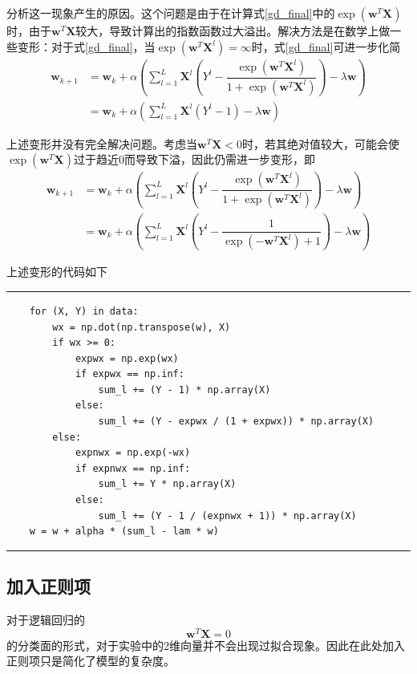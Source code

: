 分析这一现象产生的原因。这个问题是由于在计算式\ref{gd_final}中的$\exp\left(\mathbf{w}^T\mathbf{X}\right)$时，由于$\mathbf{w}^T\mathbf{X}$较大，导致计算出的指数函数过大溢出\cite{overflow}。解决方法是在数学上做一些变形：对于式\ref{gd_final}，当$\exp\left(\mathbf{w}^T\mathbf{X}^l\right)=\infty$时，式\ref{gd_final}可进一步化简
\begin{align}
    \mathbf{w}_{k+1}
    &= \mathbf{w}_k+\alpha\left(\sum^L_{l=1}\mathbf{X}^l\left(Y^l-\dfrac{\exp\left(\mathbf{w}^T\mathbf{X}^l\right)}{1+\exp\left(\mathbf{w}^T\mathbf{X}^l\right)}\right)-\lambda\mathbf{w}\right) \\
    &= \mathbf{w}_k+\alpha\left(\sum^L_{l=1}\mathbf{X}^l\left(Y^l-1\right)-\lambda\mathbf{w}\right)
\end{align}

上述变形并没有完全解决问题。考虑当$\mathbf{w}^T\mathbf{X}<0$时，若其绝对值较大，可能会使$\exp\left(\mathbf{w}^T\mathbf{X}\right)$过于趋近$0$而导致下溢，因此仍需进一步变形，即
\begin{align}
    \mathbf{w}_{k+1}
    &= \mathbf{w}_k+\alpha\left(\sum^L_{l=1}\mathbf{X}^l\left(Y^l-\dfrac{\exp\left(\mathbf{w}^T\mathbf{X}^l\right)}{1+\exp\left(\mathbf{w}^T\mathbf{X}^l\right)}\right)-\lambda\mathbf{w}\right) \\
    &= \mathbf{w}_k+\alpha\left(\sum^L_{l=1}\mathbf{X}^l\left(Y^l-\dfrac{1}{\exp\left(-\mathbf{w}^T\mathbf{X}^l\right)+1}\right)-\lambda\mathbf{w}\right)
\end{align}

上述变形的代码如下

\rule{\textwidth}{0.01em}
\begin{verbatim}
    for (X, Y) in data:
        wx = np.dot(np.transpose(w), X)
        if wx >= 0:
            expwx = np.exp(wx)
            if expwx == np.inf:
                sum_l += (Y - 1) * np.array(X)
            else:
                sum_l += (Y - expwx / (1 + expwx)) * np.array(X)
        else:
            expnwx = np.exp(-wx)
            if expnwx == np.inf:
                sum_l += Y * np.array(X)
            else:
                sum_l += (Y - 1 / (expnwx + 1)) * np.array(X)
    w = w + alpha * (sum_l - lam * w)
\end{verbatim}
\rule{\textwidth}{0.01em}

\subsection{加入正则项}

对于逻辑回归的
\begin{equation}
    \mathbf{w}^T\mathbf{X}=0
\end{equation}
的分类面的形式，对于实验中的2维向量并不会出现过拟合现象。因此在此处加入正则项只是简化了模型的复杂度。

